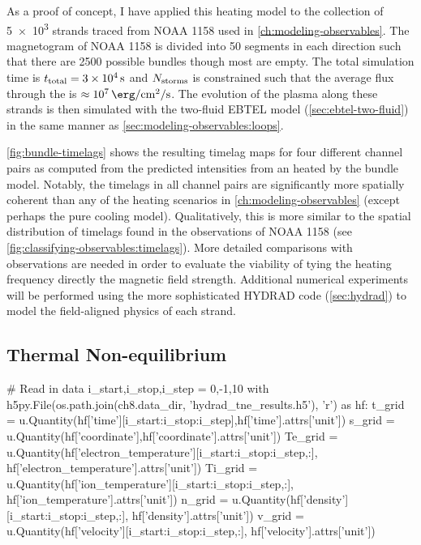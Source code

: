 As a proof of concept, I have applied this heating model to the collection of \num{5e3} strands traced from NOAA 1158 used in \autoref{ch:modeling-observables}. The magnetogram of NOAA 1158 is divided into 50 segments in each direction such that there are 2500 possible bundles though most are empty. The total simulation time is $t_\textup{total}=\SI{3e4}{\second}$ and $N_\textup{storms}$ is constrained such that the average flux through the \AR{} is $\approx\SI{e7}{\erg\per\square\cm\per\second}$. The evolution of the plasma along these strands is then simulated with the two-fluid EBTEL model (\autoref{sec:ebtel-two-fluid}) in the same manner as \autoref{sec:modeling-observables:loops}.

\autoref{fig:bundle-timelags} shows the resulting timelag maps for four different channel pairs as computed from the predicted intensities from an \AR{} heated by the bundle model. Notably, the timelags in all channel pairs are significantly more spatially coherent than any of the heating scenarios in \autoref{ch:modeling-observables} (except perhaps the pure cooling model). Qualitatively, this is more similar to the spatial distribution of timelags found in the observations of NOAA 1158 (see \autoref{fig:classifying-observables:timelags}). More detailed comparisons with observations are needed in order to evaluate the viability of tying the heating frequency directly the magnetic field strength. Additional numerical experiments will be performed using the more sophisticated HYDRAD code (\autoref{sec:hydrad}) to model the field-aligned physics of each strand.

\subsection{Thermal Non-equilibrium}\label{sec:tne}

\begin{pycode}[chapter8]
# Read in data
i_start,i_stop,i_step = 0,-1,10
with h5py.File(os.path.join(ch8.data_dir, 'hydrad_tne_results.h5'), 'r') as hf:
    t_grid = u.Quantity(hf['time'][i_start:i_stop:i_step],hf['time'].attrs['unit'])
    s_grid = u.Quantity(hf['coordinate'],hf['coordinate'].attrs['unit'])
    Te_grid = u.Quantity(hf['electron_temperature'][i_start:i_stop:i_step,:],
                         hf['electron_temperature'].attrs['unit'])
    Ti_grid = u.Quantity(hf['ion_temperature'][i_start:i_stop:i_step,:],
                         hf['ion_temperature'].attrs['unit'])
    n_grid = u.Quantity(hf['density'][i_start:i_stop:i_step,:],
                        hf['density'].attrs['unit'])
    v_grid = u.Quantity(hf['velocity'][i_start:i_stop:i_step,:],
                        hf['velocity'].attrs['unit'])
\end{pycode}

